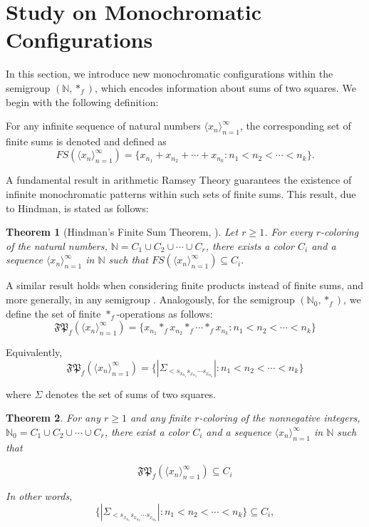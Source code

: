 \documentclass[12pt]{amsart}
\theoremstyle{plain}
\newtheorem{theorem}{Theorem}[section]
\theoremstyle{definition}
\theoremstyle{remark}
\numberwithin{equation}{section}
\begin{document}
\section{Study on Monochromatic Configurations}
In this section, we introduce new monochromatic configurations within the semigroup $(\mathbb{N}, \ast_f)$, which encodes information about sums of two squares. We begin with the following definition:

For any infinite sequence of natural numbers $\langle x_n \rangle_{n=1}^{\infty}$, the corresponding set of finite sums is denoted and defined as
$$FS(\langle x_n\rangle_{n=1}^{\infty}) = \{ x_{n_1} + x_{n_2} + \cdots + {x_{n_k}} : n_1 < n_2 < \cdots < n_k \}.$$

A fundamental result in arithmetic Ramsey Theory guarantees the existence of infinite monochromatic patterns within such sets of finite sums. This result, due to Hindman, is stated as follows:

\begin{theorem}[Hindman's Finite Sum Theorem, \cite{Hind74}]
Let $r \geq 1$. For every $r$-coloring of the natural numbers, $\mathbb{N} = C_1 \cup C_2 \cup \cdots \cup C_r$, there exists a color $C_i$ and a sequence $\langle x_n \rangle_{n=1}^{\infty}$ in $\mathbb{N}$ such that $FS(\langle x_n \rangle_{n=1}^{\infty}) \subseteq C_i.$

\end{theorem}

A similar result holds when considering finite products instead of finite sums, and more generally, in any semigroup \cite[Theorem 5.8]{HS12}. Analogously, for the semigroup $(\mathbb{N}_0, \ast_f)$, we define the set of finite $\ast_f$-operations as follows:
\[\mathfrak{FP}_f(\langle x_n \rangle_{n=1}^{\infty})= \{x_{n_1} \ast_f x_{n_2} \ast_f \cdots \ast_f x_{n_k} : n_1 < n_2 < \cdots < n_k\}
\]


Equivalently,
\[\mathfrak{FP}_f(\langle x_n \rangle_{n=1}^{\infty})= \{|\Sigma_{< s_{x_{n_1}}  s_{x_{n_2}}  \cdots s_{x_{n_k}}}| : n_1 < n_2 < \cdots < n_k\}
\]



where $\Sigma$ denotes the set of sums of two squares.

\begin{theorem}
For any $r \geq 1$ and any finite $r$-coloring of the nonnegative integers, $\mathbb{N}_0 = C_1 \cup C_2 \cup \cdots \cup C_r$, there exist a color $C_i$ and a sequence $\langle x_n \rangle_{n=1}^{\infty}$ in $\mathbb{N}$ such that

$$\mathfrak{FP}_f(\langle x_n \rangle_{n=1}^{\infty}) \subseteq C_i$$

In other words,
\[
\{|\Sigma_{< s_{x_{n_1}}  s_{x_{n_2}}  \cdots s_{x_{n_k}}}| : n_1 < n_2 < \cdots < n_k\} \subseteq C_i,
\]

\end{theorem}
\end{document}
